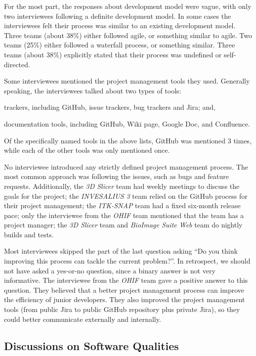 \documentclass[final, 3p, times, authoryear]{elsarticle}
\begin{document}
For the most part, the responses about development model were vague, with only
two interviewees following a definite development model. In some cases the
interviewees felt their process was similar to an existing development model.
Three teams (about 38\%) either followed agile, or something similar to agile.
Two teams (25\%) either followed a waterfall process, or something similar.
Three teams (about 38\%) explicitly stated that their process was undefined or
self-directed.

Some interviewees mentioned the project management tools they used. Generally
speaking, the interviewees talked about two types of tools:
\begin{inparaenum}[i)]
\item trackers, including GitHub, issue trackers, bug trackers and Jira; and,
\item documentation tools, including GitHub, Wiki page, Google Doc, and Confluence.
\end{inparaenum}
Of the specifically named tools in the above lists, GitHub was mentioned 3
times, while each of the other tools was only mentioned once.

No interviewee introduced any strictly defined project management process. The
most common approach was following the issues, such as bugs and feature requests.
Additionally, the \textit{3D Slicer} team had weekly meetings to discuss the
goals for the project; the \textit{INVESALIUS 3} team relied on the GitHub
process for their project management; the \textit{ITK-SNAP} team had a fixed
six-month release pace; only the interviewee from the \textit{OHIF} team
mentioned that the team has a project manager; the \textit{3D Slicer} team and
\textit{BioImage Suite Web} team do nightly builds and tests.

Most interviewees skipped the part of the last question asking ``Do you think
improving this process can tackle the current problem?''. In retrospect, we
should not have asked a yes-or-no question, since a binary answer is not very
informative. The interviewee from the \textit{OHIF} team gave a positive answer
to this question. They believed that a better project management process can
improve the efficiency of junior developers. They also improved the project
management tools (from public Jira to public GitHub repository plus private
Jira), so they could better communicate externally and internally.

\subsection{Discussions on Software Qualities} \label{sec_interview_software_qualities}
\end{document}
